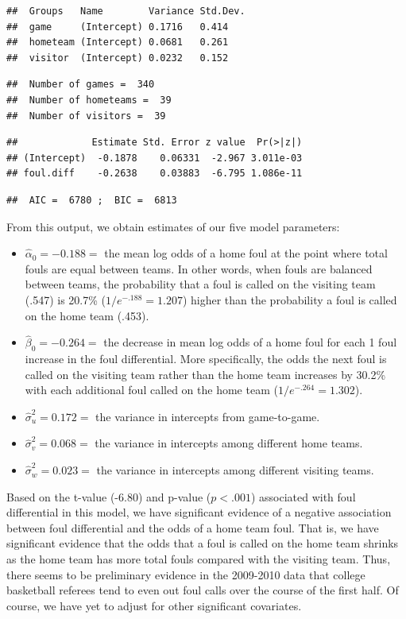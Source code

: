 \documentclass[
]{krantz}
\providecommand{\tightlist}{%
  \setlength{\itemsep}{0pt}\setlength{\parskip}{0pt}}
\begin{document}
\begin{verbatim}
##  Groups   Name        Variance Std.Dev.
##  game     (Intercept) 0.1716   0.414   
##  hometeam (Intercept) 0.0681   0.261   
##  visitor  (Intercept) 0.0232   0.152
\end{verbatim}

\begin{verbatim}
##  Number of games =  340 
##  Number of hometeams =  39 
##  Number of visitors =  39
\end{verbatim}

\begin{verbatim}
##             Estimate Std. Error z value  Pr(>|z|)
## (Intercept)  -0.1878    0.06331  -2.967 3.011e-03
## foul.diff    -0.2638    0.03883  -6.795 1.086e-11
\end{verbatim}

\begin{verbatim}
##  AIC =  6780 ;  BIC =  6813
\end{verbatim}

From this output, we obtain estimates of our five model parameters:

\begin{itemize}
\tightlist
\item
  \(\hat{\alpha}_{0}=-0.188=\) the mean log odds of a home foul at the point where total fouls are equal between teams. In other words, when fouls are balanced between teams, the probability that a foul is called on the visiting team (.547) is 20.7\% (\(1/e^{-.188}=1.207\)) higher than the probability a foul is called on the home team (.453).
\item
  \(\hat{\beta}_{0}=-0.264=\) the decrease in mean log odds of a home foul for each 1 foul increase in the foul differential. More specifically, the odds the next foul is called on the visiting team rather than the home team increases by 30.2\% with each additional foul called on the home team (\(1/e^{-.264}=1.302\)).
\item
  \(\hat{\sigma}_{u}^{2}=0.172=\) the variance in intercepts from game-to-game.
\item
  \(\hat{\sigma}_{v}^{2}=0.068=\) the variance in intercepts among different home teams.
\item
  \(\hat{\sigma}_{w}^{2}=0.023=\) the variance in intercepts among different visiting teams.
\end{itemize}

Based on the t-value (-6.80) and p-value (\(p<.001\)) associated with foul differential in this model, we have significant evidence of a negative association between foul differential and the odds of a home team foul. That is, we have significant evidence that the odds that a foul is called on the home team shrinks as the home team has more total fouls compared with the visiting team. Thus, there seems to be preliminary evidence in the 2009-2010 data that college basketball referees tend to even out foul calls over the course of the first half. Of course, we have yet to adjust for other significant covariates.
\end{document}
